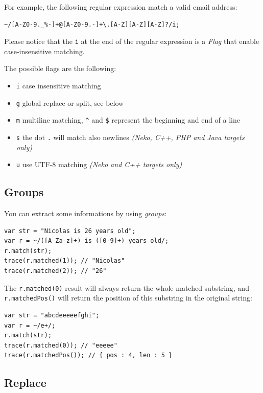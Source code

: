 \documentclass[a4paper,oneside]{book}
\newcommand{\expr}[1]{\texttt{#1}}
\begin{document}
\bigskip

For example, the following regular expression match a valid email address:
\begin{lstlisting}
~/[A-Z0-9._%-]+@[A-Z0-9.-]+\.[A-Z][A-Z][A-Z]?/i;
\end{lstlisting}

Please notice that the \expr{i} at the end of the regular expression is a \emph{Flag} that enable case-insensitive matching.

The possible flags are the following:
\begin{itemize}
    \item \expr{i} case insensitive matching
    \item \expr{g} global replace or split, see below
    \item \expr{m} multiline matching, \expr{\textasciicircum} and \expr{\$} represent the beginning and end of a line
    \item \expr{s} the dot \expr{.} will match also newlines \emph{(Neko, C++, PHP and Java targets only)}
    \item \expr{u} use UTF-8 matching \emph{(Neko and C++ targets only)}
\end{itemize}

\subsection{Groups}
You can extract some informations by using \emph{groups}:

\begin{lstlisting}
var str = "Nicolas is 26 years old";
var r = ~/([A-Za-z]+) is ([0-9]+) years old/;
r.match(str);
trace(r.matched(1)); // "Nicolas"
trace(r.matched(2)); // "26"
\end{lstlisting}

The \expr{r.matched(0)} result will always return the whole matched substring, and \expr{r.matchedPos()} will return the position of this substring in the original string:

\begin{lstlisting}
var str = "abcdeeeeefghi";
var r = ~/e+/;
r.match(str);
trace(r.matched(0)); // "eeeee"
trace(r.matchedPos()); // { pos : 4, len : 5 }
\end{lstlisting}


\subsection{Replace}
\end{document}

